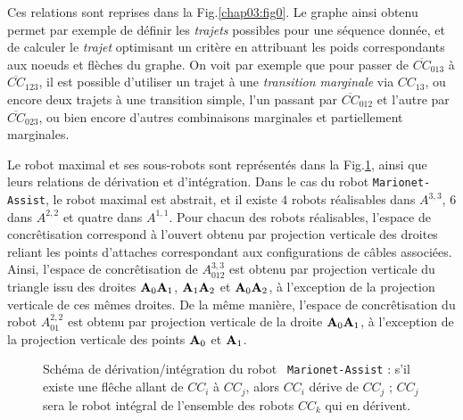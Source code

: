 Ces relations sont reprises dans la Fig.\ref{chap03:fig0}. Le graphe ainsi 
obtenu permet par exemple de d\'efinir les {\it trajets} possibles pour une 
s\'equence donn\'ee, et de calculer le {\it trajet} optimisant un crit\`ere en 
attribuant les poids correspondants aux noeuds et fl\`eches du graphe. On voit 
par exemple que pour passer de $\overline{CC}_{013}$ \`a $\overline{CC}_{123}$, 
il est possible d'utiliser un trajet \`a une {\it transition marginale} via 
$CC_{13}$, ou encore deux trajets \`a une transition simple, l'un passant par 
$\overline{CC}_{012}$ et l'autre par $\overline{CC}_{023}$, ou bien encore 
d'autres combinaisons marginales et partiellement marginales.

Le robot maximal et ses sous-robots sont repr\'esent\'es dans la 
Fig.\ref{chap03:fig1}, ainsi que leurs relations de d\'erivation et 
d'int\'egration. Dans le cas du robot {\tt Mario\-net-As\-sist}, le robot 
maximal 
est abstrait, et il existe $4$ robots r\'ealisables dans $A^{3,3}$, $6$ dans 
$A^{2,2}$ et quatre dans $A^{1,1}$. Pour chacun des robots r\'ealisables, 
l'espace de concr\^etisation correspond \`a l'ouvert obtenu par projection 
verticale des droites reliant les points d'attaches correspondant aux 
configurations de c\^ables associ\'ees. Ainsi, l'espace de concr\^etisation de 
$A^{3,3}_{012}$ est obtenu par projection verticale du triangle issu des 
droites ${\bf A}_0{\bf A}_1$, ${\bf A}_1{\bf A}_2$ et ${\bf A}_0{\bf A}_2$, \`a 
l'exception de la projection verticale de ces m\^emes droites. De la m\^eme 
mani\`ere, l'espace de concr\^etisation du robot $A^{2,2}_{01}$ est obtenu par 
projection verticale de la droite ${\bf A}_0{\bf A}_1$, \`a l'exception de la 
projection verticale des points ${\bf A}_0$ et ${\bf A}_1$.

\begin{figure}[htp]
  \centering
    \def\svgwidth{.65\linewidth}
  
    \caption{\footnotesize{Schéma de d\'erivation/int\'egration du robot {\tt 
Marionet-Assist} : s'il existe une fl\^eche allant de $CC_i$ \`a $CC_j$, 
alors $CC_i$ d\'erive de $CC_j$ ; $CC_j$ sera le robot int\'egral de l'ensemble 
des robots $CC_k$ qui en d\'erivent.}}
\label{chap03:fig1}
\end{figure}

